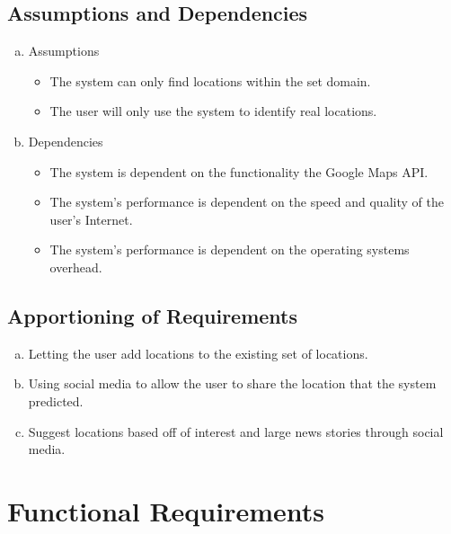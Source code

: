 \documentclass[titlepage]{article}
\newcounter{req}
\begin{document}
		\subsection{Assumptions and Dependencies}
		\label{sub:assumptions_and_dependencies}
		\begin{enumerate}[a)]
			\item Assumptions
			\begin{itemize}
				\item The system can only find locations within the set domain.
				\item The user will only use the system to identify real locations.
				
			\end{itemize}
			\item Dependencies
			
			\begin{itemize}
				\item The system is dependent on the functionality the Google Maps API.
				\item The system's performance is dependent on the speed and quality of the user's Internet.
				\item The system's performance is dependent on the operating systems overhead.
				
			\end{itemize}
		\end{enumerate}
		
		\subsection{Apportioning of Requirements}
		\label{sub:apportioning_of_requirements}
		\begin{enumerate}[a)]
			\item Letting the user add locations to the existing set of locations.
			\item Using social media to allow the user to share the location that the system predicted.
			\item Suggest locations based off of interest and large news stories through social media.
			
		\end{enumerate}
		
		\section{Functional Requirements}
		\label{sec:functional_requirements}
		
\end{document}
